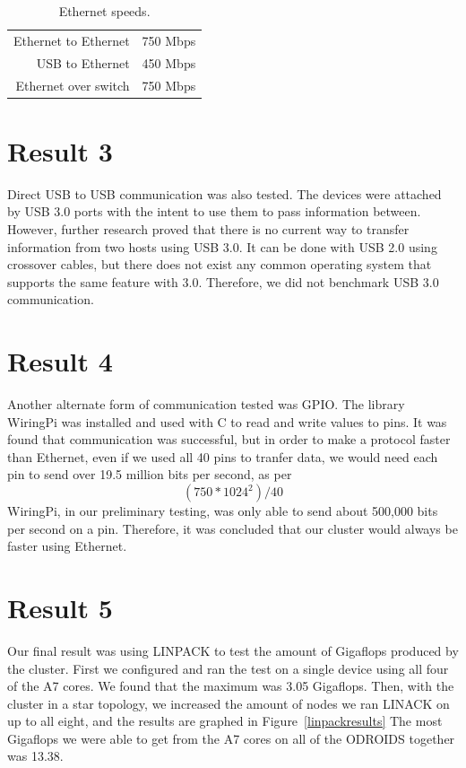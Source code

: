 \begin{table}[tbh]
\caption{Ethernet speeds. \label{ethernet}}
\begin{center}
\begin{tabular}{|r|l|}
  \hline
  Ethernet to Ethernet & 750 Mbps \\
  USB to Ethernet &  450 Mbps \\ 
  Ethernet over switch & 750 Mbps \\
  \hline
\end{tabular}
\end{center}
\end{table}

\section{Result 3}

Direct USB to USB communication was also tested. The devices were attached by USB 3.0 ports with the intent to use them to pass information between. However, further research proved that there is no current way to transfer information from two hosts using USB 3.0. It can be done with USB 2.0 using crossover cables, but there does not exist any common operating system that supports the same feature with 3.0. Therefore, we did not benchmark USB 3.0 communication.

\section{Result 4}

Another alternate form of communication tested was GPIO. The library WiringPi was installed and used with C to read and write values to pins. It was found that communication was successful, but in order to make a protocol faster than Ethernet, even if we used all 40 pins to tranfer data, we would need each pin to send over 19.5 million bits per second, as per \begin{equation}(750 * 1024^{2}) / 40 \end{equation}WiringPi, in our preliminary testing, was only able to send about 500,000 bits per second on a pin. Therefore, it was concluded that our cluster would always be faster using Ethernet.

\section{Result 5}

Our final result was using LINPACK to test the amount of Gigaflops produced by the cluster. First we configured and ran the test on a single device using all four of the A7 cores. We found that the maximum was 3.05 Gigaflops. Then, with the cluster in a star topology, we increased the amount of nodes we ran LINACK on up to all eight, and the results are graphed in Figure~\ref{linpackresults} The most Gigaflops we were able to get from the A7 cores on all of the ODROIDS together was 13.38.

